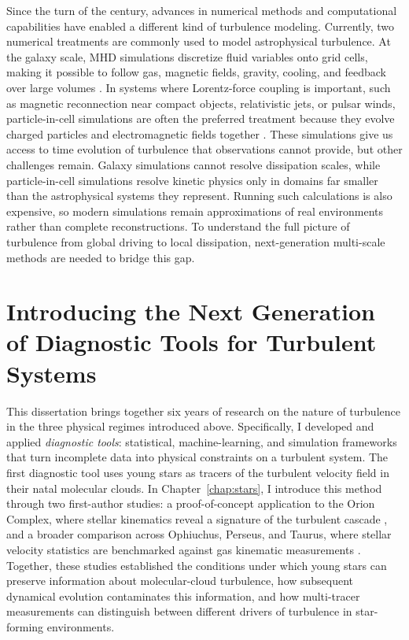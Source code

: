 Since the turn of the century, advances in numerical methods and computational capabilities have enabled a different kind of turbulence modeling.
Currently, two numerical treatments are commonly used to model astrophysical turbulence.
At the galaxy scale, MHD simulations discretize fluid variables onto grid cells, making it possible to follow gas, magnetic fields, gravity, cooling, and feedback over large volumes \citep[e.g.,][]{somerville_physical_2015,beresnyak_mhd_2019}.
In systems where Lorentz-force coupling is important, such as magnetic reconnection near compact objects, relativistic jets, or pulsar winds, particle-in-cell simulations are often the preferred treatment because they evolve charged particles and electromagnetic fields together \citep[e.g.,][]{zweibel_magnetic_2009,kagan_relativistic_2015}.
These simulations give us access to time evolution of turbulence that observations cannot provide, but other challenges remain.
Galaxy simulations cannot resolve dissipation scales, while particle-in-cell simulations resolve kinetic physics only in domains far smaller than the astrophysical systems they represent.
Running such calculations is also expensive, so modern simulations remain approximations of real environments rather than complete reconstructions.
To understand the full picture of turbulence from global driving to local dissipation, next-generation multi-scale methods are needed to bridge this gap.

\section{Introducing the Next Generation of Diagnostic Tools for Turbulent Systems}

This dissertation brings together six years of research on the nature of turbulence in the three physical regimes introduced above.
Specifically, I developed and applied \textit{diagnostic tools}: statistical, machine-learning, and simulation frameworks that turn incomplete data into physical constraints on a turbulent system.
The first diagnostic tool uses young stars as tracers of the turbulent velocity field in their natal molecular clouds.
In Chapter~\ref{chap:stars}, I introduce this method through two first-author studies: a proof-of-concept application to the Orion Complex, where stellar kinematics reveal a signature of the turbulent cascade \citep{ha_measuring_2021}, and a broader comparison across Ophiuchus, Perseus, and Taurus, where stellar velocity statistics are benchmarked against gas kinematic measurements \citep{ha_turbulence_2022}.
Together, these studies established the conditions under which young stars can preserve information about molecular-cloud turbulence, how subsequent dynamical evolution contaminates this information, and how multi-tracer measurements can distinguish between different drivers of turbulence in star-forming environments.

